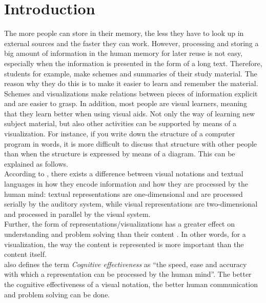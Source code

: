 \chapter{Introduction}\label{ch:introduction}

The more people can store in their memory, the less they have to look up in external sources and the faster they can work. However, processing and storing a big amount of information in the human memory for later reuse is not easy, especially when the information is presented in the form of a long text. Therefore, students for example, make schemes and summaries of their study material. The reason why they do this is to make it easier to learn and remember the material. Schemes and visualizations make relations between pieces of information explicit and are easier to grasp. In addition, most people are visual learners, meaning that they learn better when using visual aids. Not only the way of learning new subject material, but also other activities can be supported by means of a visualization. For instance, if you write down the structure of a computer program in words, it is more difficult to discuss that structure with other people than when the structure is expressed by means of a diagram. This can be explained as follows.\\

According to \cite{moody-physicsofnotations-2009}, there exists a difference between visual notations and textual languages in how they encode information and how they are processed by the human mind: textual representations are one-dimensional and are processed serially by the auditory system, while visual representations are two-dimensional and processed in parallel by the visual system.\\

Further, the form of representations/visualizations has a greater effect on understanding and problem solving than their content \citep{moody-innsbruck-2012}. In other words, for a visualization, the way the content is represented is more important than the content itself.\\

\cite{moody-physicsofnotations-2009} also defines the term \textit{Cognitive effectiveness} as ``the speed, ease and accuracy with which a representation can be processed by the human mind''. The better the cognitive effectiveness of a visual notation, the better human communication and problem solving can be done.\\

